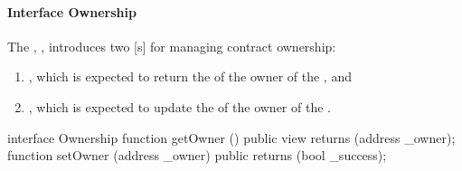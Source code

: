 \paragraph{Interface Ownership}

The , , introduces two
[s] for managing contract ownership:

\begin{enumerate}
  \item {}, which is expected to return the 
        of the owner of the , and
  \item {}, which is expected to update the 
        of the owner of the .
\end{enumerate}

\begin{solidity}
interface Ownership {
  function getOwner () public view returns (address _owner);
  function setOwner (address _owner) public returns (bool _success);
}
\end{solidity}


